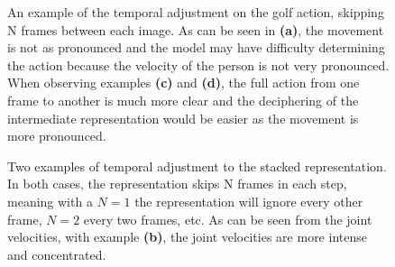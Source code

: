 \begin{figure}[ht]
	\caption{An example of the temporal adjustment on the golf action, skipping N frames between each image. As can be seen in \textbf{(a)}, the movement is not as pronounced and the model may have difficulty determining the action because the velocity of the person is not very pronounced. When observing examples \textbf{(c)} and \textbf{(d)}, the full action from one frame to another is much more clear and the deciphering of the intermediate representation would be easier as the movement is more pronounced.}
	\label{fig:temporal-adjustment-example}
\end{figure}

\begin{figure}[ht]
	\centering
	\caption{Two examples of temporal adjustment to the stacked representation. In both cases, the representation skips N frames in each step, meaning with a $N = 1$ the representation will ignore every other frame, $N = 2$ every two frames, etc. As can be seen from the joint velocities, with example \textbf{(b)}, the joint velocities are more intense and concentrated.}
	\label{fig:intermediate-stacked-skip}
\end{figure}

